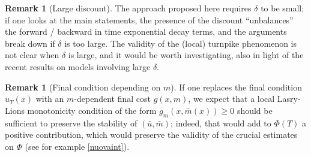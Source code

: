\documentclass[10pt,a4paper,nouppercase,nowrite]{article}
\numberwithin{equation}{section}
\newcommand{\di}{{\rm d}}
\theoremstyle{definition}
\newtheorem{rmk}[defn]{Remark}
\begin{document}
	\begin{rmk}[Large discount]
		The approach proposed here requires $\delta$ to be small; if one looks at the main statements, the presence of the discount ``unbalances'' the forward / backward in time exponential decay terms, and the arguments break down if $\delta$ is too large. The validity of the (local) turnpike phenomenon is not clear when $\delta$ is large, and it would be worth investigating, also in light of the recent results \cite{BCflock, CCont} on models involving large $\delta$.
		
	\end{rmk}
	
	\begin{rmk}[Final condition depending on $m$] If one replaces the final condition $u_T(x)$ with an $m$-dependent final cost $g(x, m)$, we expect that a local Lasry-Lions monotonicity condition of the form $g_m(x, \bar m(x)) \ge 0$ should be sufficient to preserve the stability of $(\bar u, \bar m)$; indeed, that would add to $\Phi(T)$ a positive contribution, which would preserve the validity of the crucial estimates on $\Phi$ (see for example \ref{nuovaint}).
	\end{rmk}
	
\end{document}
